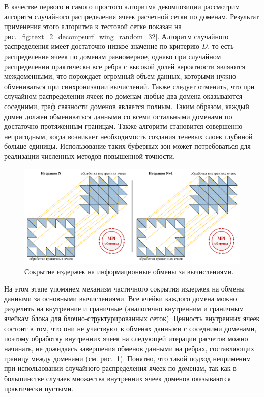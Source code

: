 В качестве первого и самого простого алгоритма декомпозиции рассмотрим алгоритм случайного распределения ячеек расчетной сетки по доменам.
Результат применения этого алгоритма к тестовой сетке показан на рис.~\ref{fig:text_2_decompsurf_wing_random_32}.
Алгоритм случайного распределения имеет достаточно низкое значение по критерию $D$, то есть распределение ячеек по доменам равномерное, однако при случайном распределении практически все ребра с высокой долей вероятности являются междоменными, что порождает огромный объем данных, которыми нужно обмениваться при синхронизации вычислений.
Также следует отменить, что при случайном распределении ячеек по доменам любые два домена оказываются соседними, граф связности доменов является полным.
Таким образом, каждый домен должен обмениваться данными со всеми остальными доменами по достаточно протяженным границам.
Также алгоритм становится совершенно непригодным, когда возникает необходимость создания теневых слоев глубиной больше единицы.
Использование таких буферных зон может потребоваться для реализации численных методов повышенной точности.

\begin{figure}[ht]
	\centering
	\includegraphics[width=1.0\textwidth]{./pics/text_2_decompsurf/mpi_border_inner.pdf}
	\caption{Сокрытие издержек на информационные обмены за вычислениями.}
	\label{fig:text_2_decompsurf_wing_border_inner}
\end{figure}

На этом этапе упомянем механизм частичного сокрытия издержек на обмены данными за основными вычислениями.
Все ячейки каждого домена можно разделить на внутренние и граничные (аналогично внутренним и граничным ячейкам блока для блочно-структурированных сеток).
Ценность внутренних ячеек состоит в том, что они не участвуют в обменах данными с соседними доменами, поэтому обработку внутренних ячеек на следующей итерации расчетов можно начинать, не дожидаясь завершения обменов данными на ребрах, составляющих границу между доменами (см. рис.~\ref{fig:text_2_decompsurf_wing_border_inner}).
Понятно, что такой подход неприменим при использовании случайного распределения ячеек по доменам, так как в большинстве случаев множества внутренних ячеек доменов оказываются практически пустыми.

